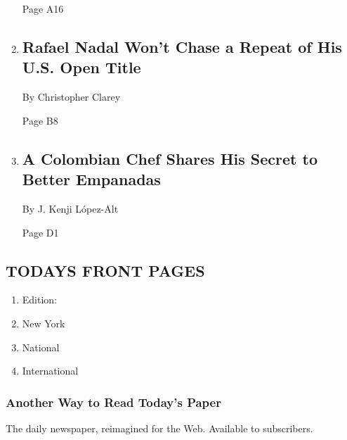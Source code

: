 \begin{enumerate}
  Page A16
\item
  \href{/2020/08/04/sports/tennis/rafael-nadal-us-open.html}{}

  \hypertarget{rafael-nadal-wont-chase-a-repeat-of-his-us-open-title}{%
  \subsection{Rafael Nadal Won't Chase a Repeat of His U.S. Open
  Title}\label{rafael-nadal-wont-chase-a-repeat-of-his-us-open-title}}

  By Christopher Clarey

  Page B8
\item
  \href{/2020/08/04/dining/colombian-empanadas-carlos-gaviria.html}{}

  \hypertarget{a-colombian-chef-shares-his-secret-to-better-empanadas}{%
  \subsection{A Colombian Chef Shares His Secret to Better
  Empanadas}\label{a-colombian-chef-shares-his-secret-to-better-empanadas}}

  By J. Kenji López-Alt

  Page D1
\end{enumerate}

\hypertarget{todays-front-pages}{%
\subsection{TODAYS FRONT PAGES}\label{todays-front-pages}}

\begin{enumerate}
\def\labelenumi{\arabic{enumi}.}
\tightlist
\item
  Edition:
\item
  New York
\item
  National
\item
  International
\end{enumerate}

\href{http://app.nytimes.com/todayspaper}{}

\hypertarget{another-way-to-read-todays-paper}{%
\subsubsection{Another Way to Read Today's
Paper}\label{another-way-to-read-todays-paper}}

The daily newspaper, reimagined for the Web. Available to subscribers.

